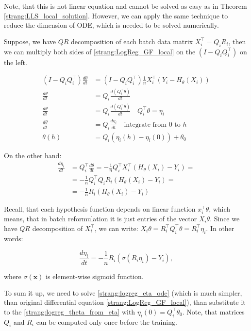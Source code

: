 \documentclass{article}
\begin{document}
Note, that this is not linear equation and cannot be solved as easy as in Theorem \ref{strang:LLS_local_solution}. However, we can apply the same technique to reduce the dimension of ODE, which is needed to be solved numerically. 

Suppose, we have $QR$ decomposition of each batch data matrix $X_i^\top = Q_i R_i$, then we can multiply both sides of \eqref{strang:LogReg_GF_local} on the $(I - Q_iQ_i^\top)$ on the left. 

\begin{align}
\nonumber (I - Q_iQ_i^\top)\frac{d \theta}{d t} &= (I - Q_iQ_i^\top) \frac{1}{n} X_i^\top(Y_i -H_\theta(X_i)) \\
\nonumber \frac{d \theta}{d t} &= Q_i\frac{d (Q_i^\top\theta)}{d t} \\
\nonumber \frac{d \theta}{d t} &= Q_i\frac{d (Q_i^\top\theta)}{d t} \quad Q_i^\top \theta = \eta_i\\ 
\nonumber \frac{d \theta}{d t} &= Q_i\frac{d \eta_i}{d t} \quad \text{integrate from $0$ to $h$}\\ 
\label{strang:logreg_theta_from_eta}\theta(h) &= Q_i \left(\eta_i(h) - \eta_i(0) \right) + \theta_0
\end{align}

On the other hand:
\begin{align}\nonumber
\frac{d \eta_i}{d t} &= Q_i^\top\frac{d \theta}{d t} =  - \frac{1}{n} Q_i^\top  X_i^\top(H_\theta(X_i) - Y_i) = \\ 
\nonumber&= - \frac{1}{n} Q_i^\top  Q_i R_i(H_\theta(X_i) - Y_i) =\\
\nonumber&= - \frac{1}{n} R_i(H_\theta(X_i) - Y_i)
\end{align}

Recall, that each hypothesis function depends on linear function $x_i^\top \theta$, which means, that in batch reformulation it is just entries of the vector $X_i \theta$. Since we have $QR$ decomposition of $X_i^\top$, we can write: $X_i \theta = R_i^\top Q_i^\top \theta = R_i^\top \eta_i$. In other words:

\begin{equation}
\label{strang:logreg_eta_ode}
\frac{d \eta_i}{d t} = - \frac{1}{n} R_i\left(\sigma\left(R_i \eta_i\right) - Y_i\right),
\end{equation}

where $\sigma(\mathbf{x})$ is element-wise sigmoid function. 

To sum it up, we need to solve \eqref{strang:logreg_eta_ode} (which is much simpler, than original differential equation \eqref{strang:LogReg_GF_local}), than substitute it to the
\eqref{strang:logreg_theta_from_eta} with $\eta_i(0) = Q_i^\top \theta_0$. Note, that matrices $Q_i$ and $R_i$ can be computed only once before the training.
\end{document}
